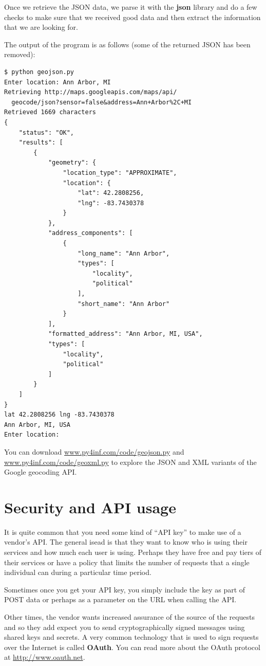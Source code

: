 \documentclass[11pt]{book}
\begin{document}
Once we retrieve the JSON data, we parse it with the {\bf json}
library and do a few checks to make sure that we received good data 
and then extract the information that we are looking for.

The output of the program is as follows (some of the returned
JSON has been removed):

\beforeverb
\begin{verbatim}
$ python geojson.py
Enter location: Ann Arbor, MI
Retrieving http://maps.googleapis.com/maps/api/
  geocode/json?sensor=false&address=Ann+Arbor%2C+MI
Retrieved 1669 characters
{
    "status": "OK", 
    "results": [
        {
            "geometry": {
                "location_type": "APPROXIMATE", 
                "location": {
                    "lat": 42.2808256, 
                    "lng": -83.7430378
                }
            }, 
            "address_components": [
                {
                    "long_name": "Ann Arbor", 
                    "types": [
                        "locality", 
                        "political"
                    ], 
                    "short_name": "Ann Arbor"
                } 
            ], 
            "formatted_address": "Ann Arbor, MI, USA", 
            "types": [
                "locality", 
                "political"
            ]
        }
    ]
}
lat 42.2808256 lng -83.7430378
Ann Arbor, MI, USA
Enter location:
\end{verbatim}
\afterverb
%
You can download 
\url{www.py4inf.com/code/geojson.py} and 
\url{www.py4inf.com/code/geoxml.py} to explore the JSON
and XML variants of the Google geocoding API. 

\section{Security and API usage}

It is quite common that you need some kind of 
``API key'' to make use of a vendor's API.  The
general isead is that they want to know who is using 
their services and how much each user is using.  
Perhaps they have free and pay tiers of their services
or have a policy that limits the number of requests 
that a single individual can during a particular 
time period.

Sometimes once you get your API key, you simply include
the key as part of POST data or perhaps as a parameter
on the URL when calling the API.

Other times, the vendor wants increased assurance of
the source of the requests and so they add expect you 
to send cryptographically signed messages using shared
keys and secrets.   A very common technology that is used 
to sign requests over the Internet is called {\bf OAuth}.
You can read more about the OAuth protocol at
\url{http://www.oauth.net}.
\end{document}
